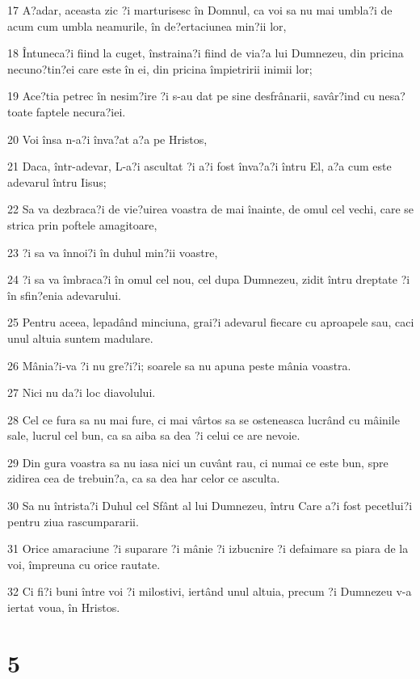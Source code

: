\par 17 A?adar, aceasta zic ?i marturisesc în Domnul, ca voi sa nu mai umbla?i de acum cum umbla neamurile, în de?ertaciunea min?ii lor,
\par 18 Întuneca?i fiind la cuget, înstraina?i fiind de via?a lui Dumnezeu, din pricina necuno?tin?ei care este în ei, din pricina împietririi inimii lor;
\par 19 Ace?tia petrec în nesim?ire ?i s-au dat pe sine desfrânarii, savâr?ind cu nesa? toate faptele necura?iei.
\par 20 Voi însa n-a?i înva?at a?a pe Hristos,
\par 21 Daca, într-adevar, L-a?i ascultat ?i a?i fost înva?a?i întru El, a?a cum este adevarul întru Iisus;
\par 22 Sa va dezbraca?i de vie?uirea voastra de mai înainte, de omul cel vechi, care se strica prin poftele amagitoare,
\par 23 ?i sa va înnoi?i în duhul min?ii voastre,
\par 24 ?i sa va îmbraca?i în omul cel nou, cel dupa Dumnezeu, zidit întru dreptate ?i în sfin?enia adevarului.
\par 25 Pentru aceea, lepadând minciuna, grai?i adevarul fiecare cu aproapele sau, caci unul altuia suntem madulare.
\par 26 Mânia?i-va ?i nu gre?i?i; soarele sa nu apuna peste mânia voastra.
\par 27 Nici nu da?i loc diavolului.
\par 28 Cel ce fura sa nu mai fure, ci mai vârtos sa se osteneasca lucrând cu mâinile sale, lucrul cel bun, ca sa aiba sa dea ?i celui ce are nevoie.
\par 29 Din gura voastra sa nu iasa nici un cuvânt rau, ci numai ce este bun, spre zidirea cea de trebuin?a, ca sa dea har celor ce asculta.
\par 30 Sa nu întrista?i Duhul cel Sfânt al lui Dumnezeu, întru Care a?i fost pecetlui?i pentru ziua rascumpararii.
\par 31 Orice amaraciune ?i suparare ?i mânie ?i izbucnire ?i defaimare sa piara de la voi, împreuna cu orice rautate.
\par 32 Ci fi?i buni între voi ?i milostivi, iertând unul altuia, precum ?i Dumnezeu v-a iertat voua, în Hristos.

\chapter{5}

